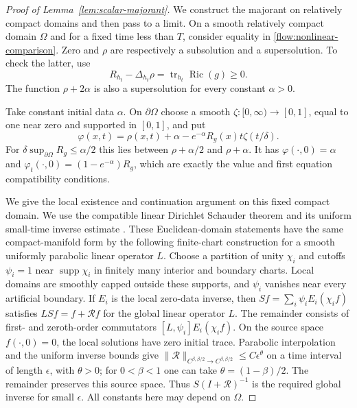 \documentclass[11pt]{article}
\theoremstyle{definition}
\theoremstyle{remark}
\DeclareMathOperator{\Ric}{Ric}
\DeclareMathOperator{\tr}{tr}
\DeclareMathOperator{\supp}{supp}
\numberwithin{equation}{section}
\begin{document}
\begin{proof}[Proof of Lemma~\ref{lem:scalar-majorant}]
We construct the majorant on relatively compact domains and then
pass to a limit.
On a smooth relatively compact domain
$\Omega$ and for a fixed time less than $T$, consider equality in
\eqref{flow:nonlinear-comparison}.  Zero and $\rho$ are respectively
a subsolution and a supersolution.  To check the latter, use
\[
 R_{h_t}-\Delta_{h_t}\rho=\tr_{h_t}\Ric(g)\ge0.
\]
The function $\rho+2\alpha$ is also a supersolution for every
constant $\alpha>0$.

Take constant initial data $\alpha$.  On $\partial\Omega$ choose
a smooth $\zeta:[0,\infty)\to[0,1]$, equal to one near zero and
supported in $[0,1]$, and put
\[
 \varphi(x,t)=\rho(x,t)+\alpha
       -e^{-\alpha}R_g(x)t\zeta(t/\delta).
\]
For $\delta\sup_{\partial\Omega}R_g\le\alpha/2$ this lies between
$\rho+\alpha/2$ and $\rho+\alpha$.
It has $\varphi(\cdot,0)=\alpha$ and
$\varphi_t(\cdot,0)=(1-e^{-\alpha})R_g$, which are exactly the
value and first equation compatibility conditions.

We give the local existence and continuation argument on this
fixed compact domain.  We use the compatible linear Dirichlet
Schauder theorem \cite[Chapter~IV, Theorem~5.2]{LSU} and its
uniform small-time inverse estimate
\cite[Chapter~IV, Theorem~5.4]{LSU}.
These Euclidean-domain statements have the same compact-manifold
form by the following finite-chart construction for a smooth
uniformly parabolic linear operator $L$.  Choose a partition of
unity $\chi_i$ and cutoffs $\psi_i=1$ near $\supp\chi_i$ in
finitely many interior and boundary charts.  Local domains are
smoothly capped outside these supports, and $\psi_i$ vanishes near
every artificial boundary.  If $E_i$ is the local zero-data inverse,
then $Sf=\sum_i\psi_i E_i(\chi_i f)$ satisfies
$LSf=f+\mathcal Rf$ for the global linear operator $L$.
The remainder consists of first- and zeroth-order commutators
$[L,\psi_i]E_i(\chi_i f)$.  On the source space
$f(\cdot,0)=0$, the local solutions have zero initial trace.
Parabolic interpolation and the uniform inverse bounds give
$\|\mathcal R\|_{C^{\beta,\beta/2}\to C^{\beta,\beta/2}}
\le C\epsilon^\theta$ on a time interval of length $\epsilon$,
with $\theta>0$; for $0<\beta<1$ one can take
$\theta=(1-\beta)/2$.  The remainder preserves this source space.
Thus $S(I+\mathcal R)^{-1}$ is the required global inverse for
small $\epsilon$.  All constants here may depend on $\Omega$.


\end{proof}
\end{document}
